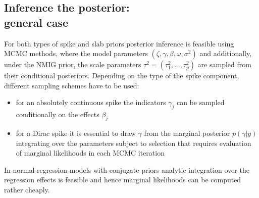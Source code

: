 \documentclass[11 pt]{article}
\begin{document}
\begin{multicols}{2}
\section{Inference the posterior:\\general case}
For both types of spike and slab priors posterior inference is feasible using MCMC methods, where the model parameters $(\zeta, \gamma, \beta, \omega, \sigma^2)$ and additionally, under the NMIG prior, the scale parameters $\tau^2 = (\tau^2_1,...,\tau^2_p)$ are sampled from their conditional posteriors. Depending on the type of the spike component, different sampling schemes have to be used:
\begin{itemize}
    \item for an absolutely continuous spike the indicators $\gamma_j$ can be sampled conditionally on the effects $\beta_j$
    \item for a Dirac spike it is essential to draw $\gamma$ from the marginal posterior $p(\gamma|y)$ integrating over the parameters subject to selection that requires evaluation of marginal likelihoods in each MCMC iteration
\end{itemize}
In normal regression models with conjugate priors analytic integration over the regression effects is feasible and hence marginal likelihoods can be
computed rather cheaply. 


\end{multicols}
\end{document}
